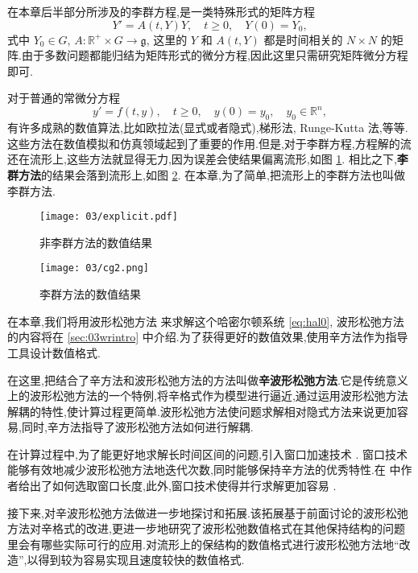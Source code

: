 在本章后半部分所涉及的李群方程,是一类特殊形式的矩阵方程
\begin{equation*}
	Y'=A(t,Y)Y,\quad t\geq 0,\quad Y(0)=Y_0,
\end{equation*}
式中 $Y_0\in G $, $A:\mathbb{R}^+\times G\to \mathfrak{g}$, 这里的 $Y$ 和 $A(t,Y)$ 都是时间相关的 $N\times N$ 的矩阵.由于多数问题都能归结为矩阵形式的微分方程,因此这里只需研究矩阵微分方程即可.

对于普通的常微分方程
\begin{equation*}
	y'=f(t,y),\quad t\geq 0,\quad y(0)=y_0,\quad y_0 \in \mathbb{R}^n,
\end{equation*}
有许多成熟的数值算法,比如欧拉法(显式或者隐式),梯形法, Runge-Kutta 法,等等.这些方法在数值模拟和仿真领域起到了重要的作用.但是,对于李群方程,方程解的流还在流形上,这些方法就显得无力,因为误差会使结果偏离流形,如图 \ref{fig:explicit}. 相比之下,\textbf{李群方法}的结果会落到流形上,如图 \ref{fig:midpoint}. 在本章,为了简单,把流形上的李群方法也叫做李群方法.

\begin{figure}[h!]
  \centering
  \texttt{[image: 03/explicit.pdf]}
  \caption{非李群方法的数值结果}
  \label{fig:explicit}
\end{figure}

\begin{figure}[h!]
  \centering
  \texttt{[image: 03/cg2.png]}
  \caption{李群方法的数值结果}
  \label{fig:midpoint}
\end{figure}

在本章,我们将用波形松弛方法 \cite{jiang2009wr} 来求解这个哈密尔顿系统 \eqref{eq:hal0}, 波形松弛方法的内容将在 \ref{sec:03wrintro} 中介绍.为了获得更好的数值效果,使用辛方法作为指导工具设计数值格式.

在这里,把结合了辛方法和波形松弛方法的方法叫做\textbf{辛波形松弛方法}.它是传统意义上的波形松弛方法的一个特例,将辛格式作为模型进行逼近,通过运用波形松弛方法解耦的特性,使计算过程更简单.波形松弛方法使问题求解相对隐式方法来说更加容易,同时,辛方法指导了波形松弛方法如何进行解耦.

在计算过程中,为了能更好地求解长时间区间的问题,引入窗口加速技术 \cite{jiang2006windowing,ladics2015error}. 窗口技术能够有效地减少波形松弛方法地迭代次数,同时能够保持辛方法的优秀特性.在 \cite{jiang2006windowing} 中作者给出了如何选取窗口长度,此外,窗口技术使得并行求解更加容易 \cite{liu2011waveform}.

接下来,对辛波形松弛方法做进一步地探讨和拓展.该拓展基于前面讨论的波形松弛方法对辛格式的改进,更进一步地研究了波形松弛数值格式在其他保持结构的问题里会有哪些实际可行的应用.对流形上的保结构的数值格式进行波形松弛方法地``改造'',以得到较为容易实现且速度较快的数值格式.


